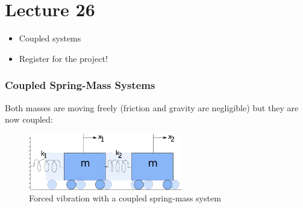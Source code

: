 \chapter*{Lecture 26}
\begin{recall}{}{}
\begin{itemize}
\item Coupled systems
\item Register for the project!
\end{itemize}
\end{recall}




\subsection{Coupled Spring-Mass Systems}
Both masses are moving freely (friction and gravity are negligible) but they are now coupled:
\begin{figure}
\centering
\includegraphics[width=0.6\textwidth]{figs/massSpringDamperSystemCoupled.pdf} 
\caption{Forced vibration with a coupled spring-mass system}
\end{figure}

